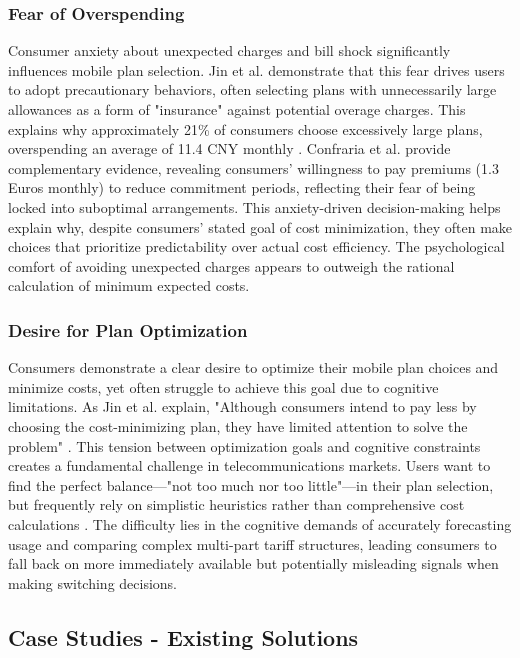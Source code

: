 \documentclass[conference]{IEEEtran}
\begin{document}
\subsubsection{Fear of Overspending}
Consumer anxiety about unexpected charges and bill shock significantly influences mobile plan selection. Jin et al. \cite{b3} demonstrate that this fear drives users to adopt precautionary behaviors, often selecting plans with unnecessarily large allowances as a form of "insurance" against potential overage charges. This explains why approximately 21\% of consumers choose excessively large plans, overspending an average of 11.4 CNY monthly \cite{b3}. Confraria et al. \cite{b2} provide complementary evidence, revealing consumers' willingness to pay premiums (1.3 Euros monthly) to reduce commitment periods, reflecting their fear of being locked into suboptimal arrangements. This anxiety-driven decision-making helps explain why, despite consumers' stated goal of cost minimization, they often make choices that prioritize predictability over actual cost efficiency. The psychological comfort of avoiding unexpected charges appears to outweigh the rational calculation of minimum expected costs.
\subsubsection{Desire for Plan Optimization}
Consumers demonstrate a clear desire to optimize their mobile plan choices and minimize costs, yet often struggle to achieve this goal due to cognitive limitations. As Jin et al. explain, "Although consumers intend to pay less by choosing the cost-minimizing plan, they have limited attention to solve the problem" \cite{b3}. This tension between optimization goals and cognitive constraints creates a fundamental challenge in telecommunications markets. Users want to find the perfect balance—"not too much nor too little"—in their plan selection, but frequently rely on simplistic heuristics rather than comprehensive cost calculations \cite{b3}. The difficulty lies in the cognitive demands of accurately forecasting usage and comparing complex multi-part tariff structures, leading consumers to fall back on more immediately available but potentially misleading signals when making switching decisions.
\subsection{Case Studies - Existing Solutions}
\end{document}
